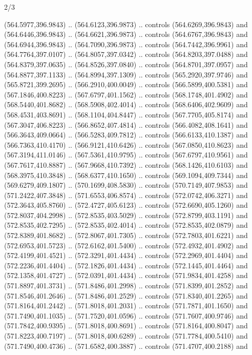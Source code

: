 \begin{flagdescription}{2/3}
\begin{scope}[xshift=0.5\flaglength,yshift=0.5\flagwidth,scale=\flagwidth/495.65]
\begin{scope}[y=0.8pt, x=0.8pt, yscale=-1,shift={(-463.76,-309.78)}]
  (564.5977,396.9843) .. (564.6123,396.9873) .. controls (564.6269,396.9843) and
  (564.6446,396.9843) .. (564.6621,396.9873) .. controls (564.6767,396.9843) and
  (564.6944,396.9843) .. (564.7090,396.9873) .. controls (564.7442,396.9961) and
  (564.7764,397.0107) .. (564.8057,397.0342) .. controls (564.8203,397.0488) and
  (564.8379,397.0635) .. (564.8526,397.0840) .. controls (564.8701,397.0957) and
  (564.8877,397.1133) .. (564.8994,397.1309) .. controls (565.2920,397.9746) and
  (565.8721,399.2695) .. (566.2910,400.0049) .. controls (566.5899,400.5381) and
  (567.1846,400.8223) .. (567.6797,401.1562) .. controls (568.1748,401.4902) and
  (568.5440,401.8682) .. (568.5908,402.4014) .. controls (568.6406,402.9609) and
  (568.4531,403.8691) .. (568.1104,404.8447) .. controls (567.7705,405.8174) and
  (567.3047,406.8223) .. (566.8652,407.4814) .. controls (566.4082,408.1641) and
  (566.3643,409.0664) .. (566.5283,409.7812) .. controls (566.6133,410.1387) and
  (566.7363,410.4170) .. (566.9121,410.6426) .. controls (567.0850,410.8623) and
  (567.3194,411.0146) .. (567.5361,410.9795) .. controls (567.6797,410.9561) and
  (567.7617,410.8887) .. (567.9668,410.7392) .. controls (568.1426,410.6103) and
  (568.3975,410.3848) .. (568.6377,410.1650) .. controls (569.1094,409.7344) and
  (569.6279,409.1807) .. (570.1699,408.5830) .. controls (570.7149,407.9853) and
  (571.2422,407.3848) .. (571.6553,406.8574) .. controls (572.0742,406.3271) and
  (572.3643,405.8760) .. (572.4727,405.6123) .. controls (572.6690,405.1260) and
  (572.8037,404.2998) .. (572.8535,403.5029) .. controls (572.8799,403.1191) and
  (572.8535,402.7295) .. (572.8535,402.4014) .. controls (572.8535,402.0879) and
  (572.8389,401.8682) .. (572.8067,401.7305) .. controls (572.7803,401.6221) and
  (572.6953,401.5723) .. (572.6162,401.5400) .. controls (572.4932,401.4902) and
  (572.4199,401.4521) .. (572.3291,401.4434) .. controls (572.2969,401.4404) and
  (572.2236,401.4404) .. (572.1826,401.4434) .. controls (572.1445,401.4464) and
  (572.1358,401.4727) .. (572.0391,401.4434) .. controls (571.9834,401.4258) and
  (571.8897,401.3731) .. (571.8486,401.2998) .. controls (571.8399,401.2852) and
  (571.8546,401.2646) .. (571.8486,401.2529) .. controls (571.8340,401.2265) and
  (571.8164,401.2442) .. (571.8018,401.2031) .. controls (571.7871,401.1650) and
  (571.7490,401.1035) .. (571.7520,401.0596) .. controls (571.7607,400.9746) and
  (571.7842,400.9395) .. (571.8018,400.8691) .. controls (571.8164,400.8047) and
  (571.8223,400.7197) .. (571.8018,400.6289) .. controls (571.7784,400.5410) and
  (571.7490,400.4736) .. (571.6582,400.3887) .. controls (571.4707,400.2188) and

\end{scope}
\end{scope}
\end{flagdescription}
